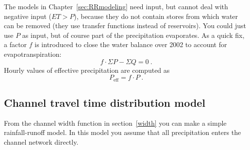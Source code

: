 \documentclass[twocolumn, 10pt, a4paper]{article}
\newenvironment{PC_prac_environment}{
\def\Q{\noindent \color{Gray}\rule[-0.1cm]{\columnwidth}{1.5pt}  \color{black} } \let\ques\Q 
\def\nQ{\noindent \color{black} } \let\ques\nQ 
\def\E{\color{Gray}\rule[0.3cm]{\columnwidth}{1.5pt} \color{black}} \let\ques\E }
\newcommand{\A}[2] { \ifthenelse{\boolean{showanswer}} {\noindent \color{cyan}{#2}\color{black}} {\multido{}{#1}{\noindent \color{light-gray}\hrulefill\\} } }
\begin{document}
\begin{PC_prac_environment}
\E

The models in Chapter~\ref{sec:RRmodeling} need input, but cannot deal with negative input ($ET>P$), because they do not contain stores from which water can be removed (they use transfer functions instead of reservoirs). You could just use $P$ as input, but of course part of the precipitation evaporates. As a quick fix, a factor $f$ is introduced to close the water balance over 2002 to account for evapotranspiration: \[f \cdot \Sigma P - \Sigma Q=0\ .\] Hourly values of effective precipitation are computed as
\[P_\mathrm{eff} = f \cdot P\ .\] 

\subsection{Channel travel time distribution model} \label{sec:tt}
From the channel width function in section~\ref{width} you can make a simple rainfall-runoff model. In this model you assume that all precipitation enters the channel network directly. 
 

\end{PC_prac_environment}
\end{document}
